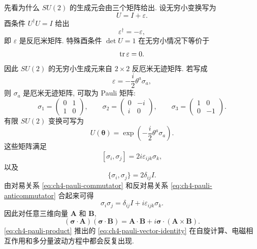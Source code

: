 先看为什么 $SU(2)$ 的生成元会由三个矩阵给出. 设无穷小变换写为
\[
U=I+\varepsilon.
\]
酉条件 $U^\dagger U=I$ 给出
\[
\varepsilon^\dagger=-\varepsilon,
\]
即 $\varepsilon$ 是反厄米矩阵. 特殊酉条件 $\det U=1$ 在无穷小情况下等价于
\[
\operatorname{tr}\varepsilon=0.
\]
因此 $SU(2)$ 的无穷小生成元来自 $2\times2$ 反厄米无迹矩阵. 若写成
\[
\varepsilon=-\frac{i}{2}\theta^a\sigma_a,
\]
则 $\sigma_a$ 是厄米无迹矩阵, 可取为 Pauli 矩阵:
\[
\sigma_1=
\begin{pmatrix}
0&1\\
1&0
\end{pmatrix},
\qquad
\sigma_2=
\begin{pmatrix}
0&-i\\
i&0
\end{pmatrix},
\qquad
\sigma_3=
\begin{pmatrix}
1&0\\
0&-1
\end{pmatrix}.
\]
有限 $SU(2)$ 变换可写为
\[
U(\bm{\theta})
=
\exp\left(
-\frac{i}{2}\theta^a\sigma_a
\right).
\]
这些矩阵满足
\begin{equation}
\label{eq:ch4-pauli-commutator}
[\sigma_i,\sigma_j]
=
2i\varepsilon_{ijk}\sigma_k,
\end{equation}
以及
\begin{equation}
\label{eq:ch4-pauli-anticommutator}
\{\sigma_i,\sigma_j\}
=
2\delta_{ij}I.
\end{equation}
由对易关系 \eqref{eq:ch4-pauli-commutator} 和反对易关系 \eqref{eq:ch4-pauli-anticommutator} 合起来可得
\begin{equation}
\label{eq:ch4-pauli-product}
\sigma_i\sigma_j
=
\delta_{ij}I+i\varepsilon_{ijk}\sigma_k.
\end{equation}
因此对任意三维向量 $\bm{A}$ 和 $\bm{B}$,
\begin{equation}
\label{eq:ch4-pauli-vector-identity}
(\bm{\sigma}\cdot\bm{A})(\bm{\sigma}\cdot\bm{B})
=
\bm{A}\cdot\bm{B}
+i\bm{\sigma}\cdot(\bm{A}\times\bm{B}).
\end{equation}
\eqref{eq:ch4-pauli-product} 推出的 \eqref{eq:ch4-pauli-vector-identity} 在自旋计算、电磁相互作用和多分量波动方程中都会反复出现. 

